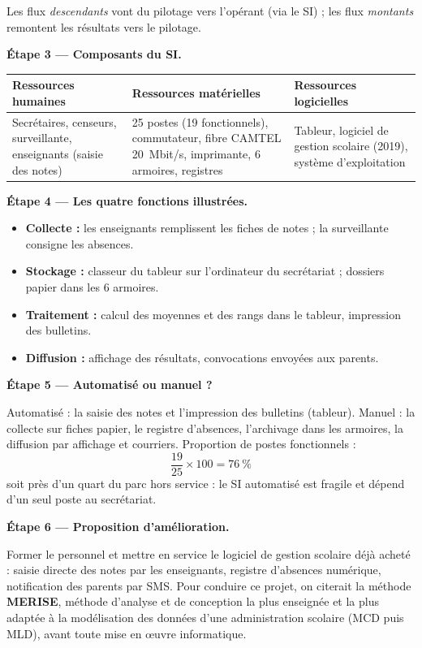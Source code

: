 \documentclass[11pt]{article}
\begin{document}
\begin{exoresolu}
Les flux \emph{descendants} vont du pilotage vers l'opérant (via le SI) ; les flux \emph{montants} remontent les résultats vers le pilotage.

\textbf{Étape 3 — Composants du SI.}

\begin{center}
\begin{tabularx}{\linewidth}{|X|X|X|}
\hline
\rowcolor{popblueL} \textbf{Ressources humaines} & \textbf{Ressources matérielles} & \textbf{Ressources logicielles} \\
\hline
Secrétaires, censeurs, surveillante, enseignants (saisie des notes) & 25 postes (19 fonctionnels), commutateur, fibre CAMTEL \SI{20}{Mbit/s}, imprimante, 6 armoires, registres & Tableur, logiciel de gestion scolaire (2019), système d'exploitation \\
\hline
\end{tabularx}
\end{center}

\textbf{Étape 4 — Les quatre fonctions illustrées.}

\begin{itemize}
  \item \textbf{Collecte :} les enseignants remplissent les fiches de notes ; la surveillante consigne les absences.
  \item \textbf{Stockage :} classeur du tableur sur l'ordinateur du secrétariat ; dossiers papier dans les 6 armoires.
  \item \textbf{Traitement :} calcul des moyennes et des rangs dans le tableur, impression des bulletins.
  \item \textbf{Diffusion :} affichage des résultats, convocations envoyées aux parents.
\end{itemize}

\textbf{Étape 5 — Automatisé ou manuel ?}

Automatisé : la saisie des notes et l'impression des bulletins (tableur). Manuel : la collecte sur fiches papier, le registre d'absences, l'archivage dans les armoires, la diffusion par affichage et courriers. Proportion de postes fonctionnels :
\[ \frac{19}{25} \times 100 = 76~\% \]
soit près d'un quart du parc hors service : le SI automatisé est fragile et dépend d'un seul poste au secrétariat.

\textbf{Étape 6 — Proposition d'amélioration.}

Former le personnel et mettre en service le logiciel de gestion scolaire déjà acheté : saisie directe des notes par les enseignants, registre d'absences numérique, notification des parents par SMS. Pour conduire ce projet, on citerait la méthode \textbf{MERISE}, méthode d'analyse et de conception la plus enseignée et la plus adaptée à la modélisation des données d'une administration scolaire (MCD puis MLD), avant toute mise en \oe uvre informatique.
\end{exoresolu}
\end{document}

